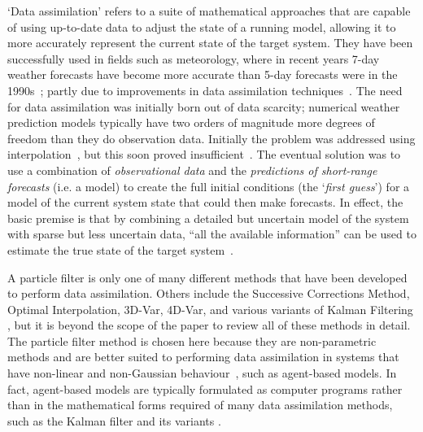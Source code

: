  `Data assimilation' refers to a suite of mathematical approaches that are capable of using up-to-date data to adjust the state of a running model, allowing it to more accurately represent the current state of the target system. They have been successfully used in fields such as meteorology, where in recent years 7-day weather forecasts have become more accurate than 5-day forecasts were in the 1990s~\citep{bauer_quiet_2015}; partly due to improvements in data assimilation techniques~\citep{kalnay_atmospheric_2003}. The need for data assimilation was initially born out of data scarcity; numerical weather prediction models typically have two orders of magnitude more degrees of freedom than they do observation data. Initially the problem was addressed using interpolation~\citep[e.g.][]{panofsky_objective_1949, charney_dynamic_1951}, but this soon proved insufficient~\citep{kalnay_atmospheric_2003}. The eventual solution was to use a combination of \textit{observational data} and the \textit{predictions of short-range forecasts} (i.e. a model) to create the full initial conditions (the `\textit{first guess}') for a model of the current system state that could then  make forecasts. In effect, the basic premise is that by combining a detailed but uncertain model of the system with sparse but less uncertain data, ``all the available information'' can be used to estimate the true state of the target system~\citep{talagrand_use_1991}. 

A particle filter is only one of many different methods that have been developed to perform data assimilation. Others include the Successive Corrections Method, Optimal Interpolation, 3D-Var, 4D-Var, and various variants of Kalman Filtering \citep{carrassi_data_2018}, but it is beyond the scope of the paper to review all of these methods in detail. The particle filter method is chosen here because they are non-parametric methods and are better suited to performing data assimilation in systems that have non-linear and non-Gaussian behaviour~\citep{long_spatial_2017}, such as agent-based models. In fact, agent-based models are typically formulated as computer programs rather than in the mathematical forms required of many data assimilation methods, such as the Kalman filter and its variants \citep{wang_data_2015}.


